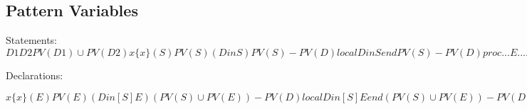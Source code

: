\documentclass[a4paper]{memoir}
\begin{document}
\begin{appendices} 

  \chapter{Pattern Variables}\label{appendix:patternvariables}
Statements:
$
D1 D2                        PV(D1) \cup PV(D2)
x                            \{x\}
(S)                          PV(S)
(D in S)                     PV(S) - PV(D)
local D in S end             PV(S) - PV(D)
proc ... {E ...} ... end     PV(E)
fun ... {E ...} ... end      PV(E)
class E ... end              PV(E)
functor E ... end            PV(E)
E = ...                      PV(E)
otherwise                    \emptyset
$


Declarations:

$
x                                         \{x\}
(E)                                       PV(E)
(D in [ S ] E)                            (PV(S) \cup PV(E)) - PV(D)
local D in [ S ] E end                    (PV(S) \cup PV(E)) - PV(D)
E1 = E2                                   PV(E1) \cup PV(E2)
[E1 ... En]                               PV(E1) \cup ... \cup PV(En)
E1|E2                                     PV(E1) \cup PV(E2)
E1\#...\#En                                 PV(E1) \cup ... \cup PV(En)
il([ f1: ] E1 ... [ fn: ] En [ ... ])     PV(E1) \cup ... \cup PV(En)
otherwise                                 \emptyset
$


\end{appendices}
\end{document}
